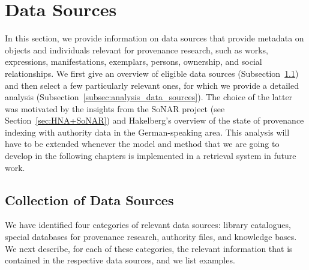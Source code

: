 \section{Data Sources}
\label{sec:data_sources}

In this section, we provide information on data sources
that provide metadata on objects and individuals
relevant for provenance research, such as works, expressions, manifestations, exemplars,
persons, ownership, and social relationships.
We first give an overview of eligible data sources (Subsection~\ref{subsec:collection_data_sources})
and then select a few particularly relevant ones, for which we provide a detailed analysis
(Subsection~\ref{subsec:analysis_data_sources}).
The choice of the latter was motivated by the insights from the \gls{SoNAR} project (see Section~\ref{sec:HNA+SoNAR})
and Hakelberg's \autocite*[§4]{Hakelberg2016} overview of the state of provenance indexing with authority data
in the German-speaking area. This analysis will have to be extended
whenever the model and method that we are going to develop in the following chapters
is implemented in a retrieval system in future work.

\subsection{Collection of Data Sources}
\label{subsec:collection_data_sources}

We have identified four categories of relevant data sources:
library catalogues, special databases for provenance research, authority files, and knowledge bases.
We next describe, for each of these categories, the relevant information that is
contained in the respective data sources, and we list examples.

